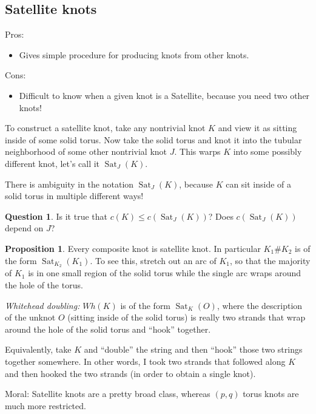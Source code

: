 \documentclass[11pt]{article}
\DeclareMathOperator{\Sat}{Sat}
\theoremstyle{plain}
\theoremstyle{definition}
\newtheorem{prop}{Proposition}
\newtheorem{question}{Question}
\begin{document}
\subsection{Satellite knots}

Pros:

\begin{itemize}
  \item Gives simple procedure for producing knots from other knots.
\end{itemize}

Cons:

\begin{itemize}
  \item Difficult to know when a given knot is a Satellite, because you need two other knots!
\end{itemize}

To construct a satellite knot, take any nontrivial knot $K$ and view it as sitting inside of some solid torus. Now take the solid torus and knot it into the tubular neighborhood of some other nontrivial knot $J$. This warps $K$ into some possibly different knot, let's call it
$\Sat_{J}(K)$.

There is ambiguity in the notation $\Sat_J(K)$, because $K$ can sit inside of a solid torus in multiple different ways!

\begin{question}
  Is it true that $c(K)\le c(\Sat_{J}(K))$? Does $c(\Sat_{J}(K))$ depend on $J$?
\end{question}


\begin{prop}
  Every composite knot is satellite knot. In particular $K_1 \# K_2$ is of the form $\Sat_{K_2}(K_1)$. To see this, stretch out an arc of $K_1$, so that the majority of $K_1$ is in one small region of the solid torus while the single arc wraps around the hole of the torus. 
\end{prop}

\textit{Whitehead doubling:}
$Wh(K)$ is of the form $\Sat_K(O)$, where the description of the unknot $O$ (sitting inside of the solid torus) is really two strands that wrap around the hole of the solid torus and ``hook'' together.

Equivalently, take $K$ and ``double'' the string and then ``hook'' those two strings together somewhere. In other words, I took two strands that followed along $K$ and then hooked the two strands (in order to obtain a single knot).

\bigskip
Moral: Satellite knots are a pretty broad class, whereas $(p,q)$ torus knots are much more restricted.
\end{document}
